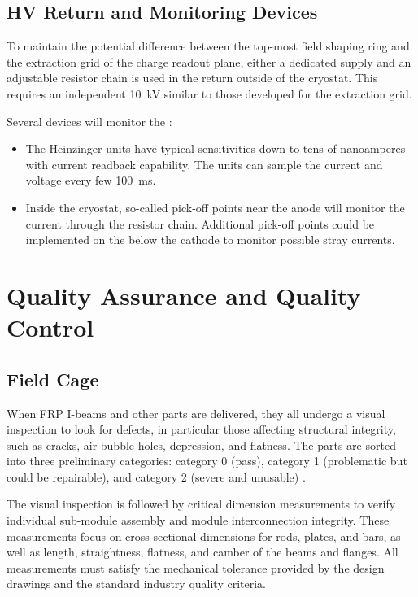 \subsection{HV Return and Monitoring Devices}

To maintain the potential difference between the top-most field shaping ring and the extraction grid of the charge readout plane, either a dedicated  supply and an adjustable resistor chain is used in the  return outside of the cryostat.   This requires an independent \SI{10}{kV} \fdth similar to those developed for the extraction grid.

Several devices will monitor the :  
\begin{itemize}
\item The Heinzinger units have typical sensitivities down to tens of nanoamperes with current readback capability.  The units can sample the current and voltage every few \SI{100}{\milli\s}.  
\item Inside the cryostat, so-called pick-off points near the anode will monitor the current through the  resistor chain. Additional pick-off points could be implemented on the  below the cathode to monitor possible stray currents.
\end{itemize}


\section{Quality Assurance and Quality Control}
\label{sec:fddp-hv-qa}

\subsection{Field Cage} When FRP I-beams and other parts are delivered, they all undergo a visual inspection to look for defects, in particular those affecting structural integrity, such as cracks, air bubble holes, depression, and flatness. The parts are sorted into three preliminary categories: category 0 (pass), category 1 (problematic but could be repairable), and category 2 (severe and unusable) .

The visual inspection is followed by critical dimension measurements to verify individual sub-module assembly and module interconnection integrity.  These measurements focus on cross sectional dimensions for rods, plates, and bars, as well as length, straightness, flatness, and camber of the beams and flanges.
All measurements must satisfy the mechanical tolerance provided by the design drawings and the standard industry quality criteria.

